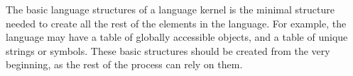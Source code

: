 The basic language structures of a language kernel is the minimal structure needed to create all the rest of the elements in the language. For example, the language may have a table of globally accessible objects, and a table of unique strings or symbols. These basic structures should be created from the very beginning, as the rest of the process can rely on them.
%
%
%
%

